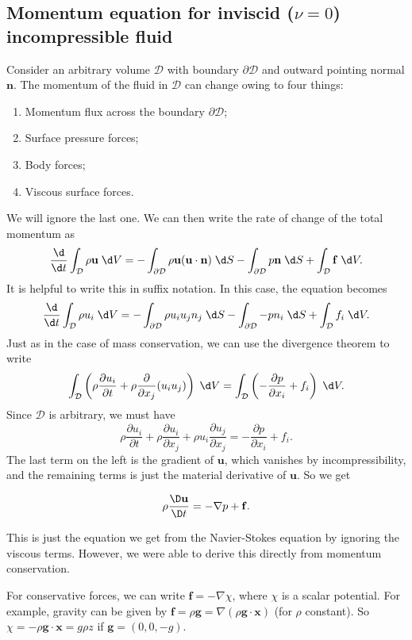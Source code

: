 \documentclass[a4paper]{article}
\begin{document}
\subsection{Momentum equation for inviscid (\texorpdfstring{$\nu = 0$}{nu = 0}) incompressible fluid}
Consider an arbitrary volume $\mathcal{D}$ with boundary $\partial \mathcal{D}$ and outward pointing normal $\mathbf{n}$. The momentum of the fluid in $\mathcal{D}$ can change owing to four things:
\begin{enumerate}
  \item Momentum flux across the boundary $\partial \mathcal{D}$;
  \item Surface pressure forces;
  \item Body forces;
  \item Viscous surface forces.
\end{enumerate}
We will ignore the last one. We can then write the rate of change of the total momentum as
\[
  \frac{\d}{\d t} \int_{\mathcal{D}} \rho \mathbf{u} \;\d V = -\int_{\partial \mathcal{D}} \rho \mathbf{u} (\mathbf{u}\cdot \mathbf{n}) \;\d S - \int_{\partial \mathcal{D}} p \mathbf{n}\;\d S + \int_{\mathcal{D}} \mathbf{f}\;\d V.
\]
It is helpful to write this in suffix notation. In this case, the equation becomes
\[
  \frac{\d}{\d t} \int_{\mathcal{D}} \rho u_i \;\d V = -\int_{\partial \mathcal{D}} \rho u_i u_j n_j \;\d S - \int_{\partial \mathcal{D}} - p n_i \;\d S + \int_{\mathcal{D}} f_i \;\d V.
\]
Just as in the case of mass conservation, we can use the divergence theorem to write
\[
  \int_{\mathcal{D}} \left(\rho \frac{\partial u_i}{\partial t} + \rho \frac{\partial}{\partial x_j} (u_i u_j)\right)\;\d V = \int_{\mathcal{D}} \left(-\frac{\partial p}{\partial x_i} + f_i\right) \;\d V.
\]
Since $\mathcal{D}$ is arbitrary, we must have
\[
  \rho \frac{\partial u_i}{\partial t} + \rho \frac{\partial u_i}{\partial x_j} + \rho u_i \frac{\partial u_j}{\partial x_j} = -\frac{\partial p}{\partial x_i} + f_i.
\]
The last term on the left is the gradient of $\mathbf{u}$, which vanishes by incompressibility, and the remaining terms is just the material derivative of $\mathbf{u}$. So we get
\begin{prop}
  \[
    \rho \frac{\D \mathbf{u}}{\D t} = - \nabla p + \mathbf{f}.
  \]
\end{prop}
This is just the equation we get from the Navier-Stokes equation by ignoring the viscous terms. However, we were able to derive this directly from momentum conservation.

For conservative forces, we can write $\mathbf{f} = -\nabla \chi$, where $\chi$ is a scalar potential. For example, gravity can be given by $\mathbf{f} = \rho \mathbf{g} = \nabla (\rho \mathbf{g}\cdot \mathbf{x})$ (for $\rho$ constant). So $\chi = - \rho \mathbf{g}\cdot \mathbf{x} = g \rho z$ if $\mathbf{g} = (0, 0, -g)$.
\end{document}
